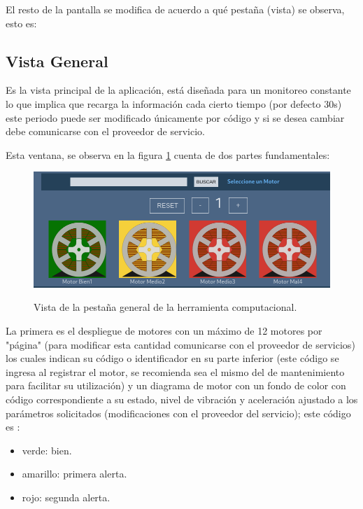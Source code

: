 \documentclass[12pt]{article}
\begin{document}
El resto de la pantalla se modifica de acuerdo a qué pestaña (vista) se observa,
esto es:

\subsection{Vista General}
Es la vista principal de la aplicación, está diseñada para un monitoreo constante
lo que implica que recarga la información cada cierto tiempo (por defecto 30s)
este periodo puede ser modificado únicamente por código y si se desea cambiar debe
comunicarse con el proveedor de servicio.

Esta ventana, se observa en la figura \ref{img:vistaGeneralManual}
cuenta de dos partes fundamentales:

    \begin{figure}[H]
		\centering
        \caption{Vista de la pestaña general de la herramienta computacional. }
        \includegraphics[width=\linewidth]{ManualUsuario/general.png}
        \label{img:vistaGeneralManual}
	\end{figure}

La primera es el despliegue de motores
con un máximo de 12 motores por "página" (para modificar esta cantidad comunicarse
con el proveedor de servicios) los cuales indican su código o identificador en
su parte inferior (este código se ingresa al registrar el motor, se recomienda sea
el mismo del de mantenimiento para facilitar su utilización) y un diagrama de
motor con un fondo de color con código correspondiente a su estado, nivel de
vibración y aceleración ajustado a los parámetros solicitados (modificaciones con
el proveedor del servicio); este código es :

\begin{itemize}
    \item  verde: bien.
    \item amarillo: primera alerta.
    \item rojo: segunda alerta.
\end{itemize}
\end{document}
